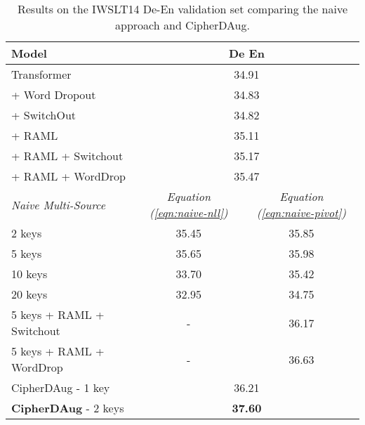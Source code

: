 \documentclass[11pt]{article}
\begin{document}
\begin{table}[ht]
\centering
\small
\begin{tabular}{lcc}
\toprule
 \textbf{Model} & \multicolumn{2}{c}{\textbf{De  En}} \\ \midrule
 Transformer & \multicolumn{2}{c}{34.91} \\
 \midrule
 + Word Dropout & \multicolumn{2}{c}{34.83} \\
 + SwitchOut & \multicolumn{2}{c}{34.82} \\
 + RAML & \multicolumn{2}{c}{35.11} \\
 + RAML + Switchout & \multicolumn{2}{c}{35.17} \\
 + RAML + WordDrop & \multicolumn{2}{c}{35.47} \\
 \midrule
 \scriptsize{\emph{Naive Multi-Source}} &  \scriptsize{\emph{Equation (\ref{eqn:naive-nll})}} & \scriptsize{\emph{Equation (\ref{eqn:naive-pivot})}} \\
 2 keys  & 35.45  & 35.85 \\ 
 5 keys  & 35.65 & 35.98 \\ 
 10 keys  & 33.70 & 35.42 \\ 
 20 keys & 32.95 & 34.75\\
 \midrule
 5 keys + RAML + Switchout & - & 36.17 \\
 5 keys + RAML + WordDrop & - & 36.63 \\ \midrule
 CipherDAug - 1 key & \multicolumn{2}{c}{36.21} \\
 \textbf{CipherDAug} - 2 keys & \multicolumn{2}{c}{\textbf{37.60}} \\
 \bottomrule 
 
\end{tabular}
\caption{Results on the IWSLT14 De-En validation set comparing the naive approach and CipherDAug.\footnotemark}\vspace{-1.5em}
\label{tab:naive}
\end{table}

\end{document}
